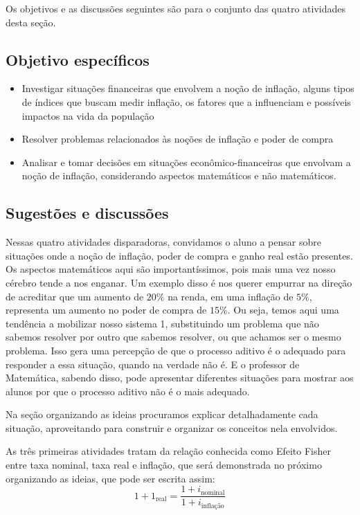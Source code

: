 \def\currentcolor{session1}
\begin{texto}
{
  Os objetivos e as discussões seguintes são para o conjunto das quatro atividades desta seção.

  \subsection{Objetivo específicos}
  \begin{itemize}
  \item Investigar situações financeiras que envolvem a noção de inflação, alguns tipos de índices que buscam medir inflação, os fatores que a influenciam e possíveis impactos na vida da população
  \item Resolver problemas relacionados às noções de inflação e poder de compra
  \item Analisar e tomar decisões em situações econômico-financeiras que envolvam a noção de inflação, considerando aspectos matemáticos e não matemáticos.
  \end{itemize}

  \subsection{Sugestões e discussões}

  Nessas quatro atividades disparadoras, convidamos o aluno a pensar sobre situações onde a noção de inflação, poder de compra e ganho real estão presentes. Os aspectos matemáticos aqui são importantíssimos, pois mais uma vez nosso cérebro tende a nos enganar. Um exemplo disso é nos querer empurrar na direção de acreditar que um aumento de $20\%$ na renda, em uma inflação de $5\%$, representa um aumento no poder de compra de $15\%$. Ou seja, temos aqui uma tendência a mobilizar nosso sistema 1, substituindo um problema que não sabemos resolver por outro que sabemos resolver, ou que achamos ser o mesmo problema. Isso gera uma percepção de que o processo aditivo é o adequado para responder a essa situação, quando na verdade não é. E o professor de Matemática, sabendo disso, pode apresentar diferentes situações para mostrar aos alunos por que o processo aditivo não é o mais adequado.

  Na seção organizando as ideias procuramos explicar detalhadamente cada situação, aproveitando para construir e organizar os conceitos nela envolvidos.

  As três primeiras atividades tratam da relação conhecida como Efeito Fisher entre taxa nominal, taxa real e inflação, que será demonstrada no próximo organizando as ideias, que pode ser escrita assim:
  \begin{equation*}
  1+1_{\text{real}}=\frac{1+i_{\text{nominal}}}{1+i_{\text{inflação}}}
  \end{equation*}

}
\end{texto}
